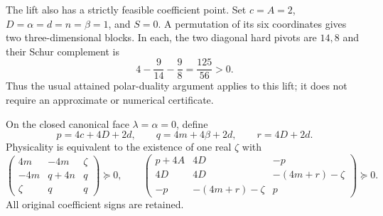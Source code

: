 The lift also has a strictly feasible coefficient point. Set
$c=A=2$, $D=\alpha=d=n=\beta=1$, and $S=0$. A permutation of
its six coordinates gives two three-dimensional blocks. In each,
the two diagonal hard pivots are $14,8$ and their Schur complement
is
\[
 4-\frac9{14}-\frac98=\frac{125}{56}>0.                    \tag{CF8}
\]
Thus the usual attained polar-duality argument applies to this lift;
it does not require an approximate or numerical certificate.

\begin{theorem}
\label{thm:closed-face-opposite}
On the closed canonical face $\lambda=\alpha=0$, define
\[
 p=4c+4D+2d,\qquad q=4m+4\beta+2d,\qquad r=4D+2d.
\]
Physicality is equivalent to the existence of one real $\zeta$ with
\[
 \begin{pmatrix}
 4m&-4m&\zeta\\
 -4m&q+4n&q\\
 \zeta&q&q
 \end{pmatrix}\succeq0,\qquad
 \begin{pmatrix}
 p+4A&4D&-p\\
 4D&4D&-(4m+r)-\zeta\\
 -p&-(4m+r)-\zeta&p
 \end{pmatrix}\succeq0.                                  \tag{CF9}
\]
All original coefficient signs are retained.
\end{theorem}
